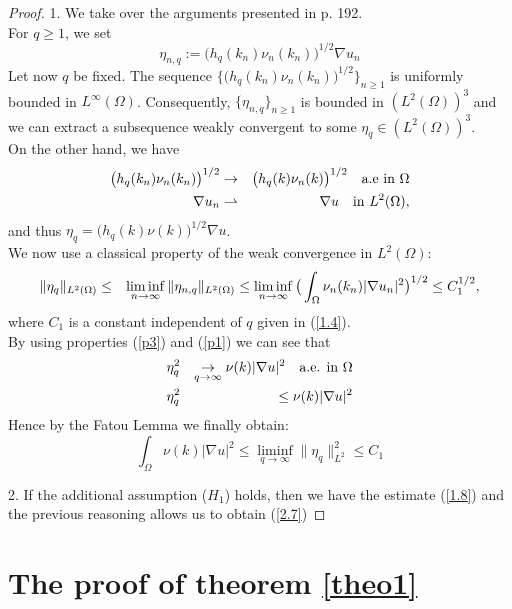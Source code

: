 \documentclass{elsart}
\begin{document}
\begin{proof}
1. We take over the arguments presented in \cite{lewan} p. 192. \\ 
For $q\geq 1$, we set 
$$\eta_{n,q}:=\big(h_q(k_n)\nu_n(k_n)\big)^{1/2}\nabla u_n$$
Let now $q$ be fixed. The sequence 
$\big\{\big(h_q(k_n)\nu_n(k_n)\big)^{1/2}\big\}_{n\geq 1}$ is uniformly
bounded in $L^{\infty}(\Omega)$. Consequently, $\{\eta_{n,q}\}_{n\geq 1}$
is bounded in $(L^2(\Omega))^3$ and we can extract a subsequence 
weakly convergent to some $\eta_q \in (L^2(\Omega))^3$. \\ 
On the other hand, we have 
\begin{eqnarray}
\big(h_q(k_n)\nu_n(k_n)\big)^{1/2} &\rightarrow&
\big(h_q(k)\nu_n(k)\big)^{1/2} \quad \text{a.e in } \Omega \notag \\
\nabla u_n &\rightharpoonup& \nabla u \quad \text{in } L^2(\Omega),
\notag
\end{eqnarray}
and thus $\eta_q=\big(h_q(k)\nu(k)\big)^{1/2} \nabla u$. \\ 
We now use a classical property of the weak convergence in
$L^2(\Omega)$:
\begin{eqnarray}
\|\eta_q\|_{L^2(\Omega)} &\leq& \liminf\limits_{n\to \infty}
\|\eta_{n,q}\|_{L^2(\Omega)} \leq \liminf\limits_{n\to \infty} 
\big(\int_{\Omega} \nu_n(k_n)|\nabla u_n|^2\big)^{1/2} \notag 
\leq C_1^{1/2}, \notag
\end{eqnarray}
where $C_1$ is a constant independent of $q$ given in (\ref{1.4}). \\ 
By using properties (\ref{p3}) and (\ref{p1}) we can see that 
\begin{eqnarray}
&\eta_q^2& \underset{q\to\infty}{\rightarrow}\nu(k)|\nabla u|^2 \quad
\text{a.e. in }\Omega \notag \\
&\eta_q^2&\leq \nu(k)|\nabla u|^2 \notag
\end{eqnarray}
Hence by the Fatou Lemma we finally obtain: 
$$\int_{\Omega} \nu(k)|\nabla u |^2 \leq \liminf\limits_{q \to \infty}
\|\eta_q\|_{L^2}^2 \leq C_1$$

2. If the additional assumption ($H_1$) holds, then we have the
   estimate (\ref{1.8}) and the previous reasoning allows us to obtain
   (\ref{2.7})
\end{proof}

\section{The proof of theorem \ref{theo1}} \label{sec3}
\end{document}
